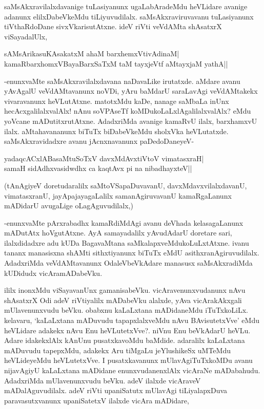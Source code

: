saMsAkxravilalxdavanige tuLasiyanunx ugaLabAradeMdu heVLidare avanige adanunx elilxDabeVkeMdu tiLiyuvudilalx. saMsAkxraviruvavanu tuLasiyanunx tiVthaRdoDane sivxVkarisutAtxne. ideV riVti veVdAMta shAsatxrX viSayadalUlx,

\begin{shloka}
sAMsArikasuKAsakatxM ahaM barxhemxVtivAdinaM|\\
kamaRbarxhomxVBayaBarxSaTxM taM tayxjeVtf aMtayxjaM yathA||
\end{shloka}

-enunxvaMte saMsAkxravilalxdavana naDavaLike irutatxde. aMdare avanu yAvAgalU veVdAMtavanunx noVDi, yAru baMdarU saraLavAgi veVdAMtakekx vivaravanunx heVLutAtxne. matotxMdu kaDe, nanage saMbaLa inUnx hecAcxgalilalxvalAlx! nAnu soVPAseTf koMDukoLaLxlAgalilalxvalAlx? eMdu yoVcane mADutitxrutAtxne. AdadxriMda avanige kamaRvU ilalx, barxhamxvU ilalx. aMtahavananunx biTuTx biDabeVkeMdu sholxVka heVLutatxde. saMsAkxravidadxre avanu jAcnxnavanunx paDedoDaneyeV-

\begin{shloka}
yadaqcACxlABasaMtuSoTxV davxMdAvxtiVtoV vimatasxraH|\\
samaH sidAdhxvasidwdhx ca kaqtAvx pi na nibadhayxteV||
\end{shloka}

(tAnAgiyeV doretudaralilx saMtoVSapaDuvavanU, davxMdavxvilalxdavanU, vimatasxranU, jayApajayagaLalilx samanAgiruvavanU kamaRgaLanunx mADidarU avugaLige oLagAguvudilalx,)

-enunxvaMte pArxrabadhx kamaRdiMdAgi avanu deVhada kelasagaLanunx mADutAtx hoVgutAtxne. AyA samayadalilx yAvudAdarU doretare sari, ilalxdidadxre adu kUDa BagavaMtana saMkalapxveMdukoLuLxtAtxne. ivanu tananx manasisxna shAMti sithxtiyanunx biTuTx eMdU asithxranAgiruvudilalx. AdadxriMda veVdAMtavanunx OdaleVbeVkAdare manasusx saMsAkxradiMda kUDidudx vicAramADabeVku.

ililx inonxMdu viSayavanUnx gamanisabeVku. vicAravenunxvudanunx nAvu shAsatxrX Odi adeV riVtiyalilx mADabeVku alalxde, yAva vicArakAkxgali mUlavenunxvudu beVku. obabxnu kaLaLxtana mADidaneMdu iTuTxkoLiLx. kelavaru, `kaLaLxtana mADuvudu tapapxlalxveMdu nAvu BAvisutetxVve' eMdu heVLidare adakekx nAvu Enu heVLutetxVve?. niVnu Enu beVkAdarU heVLu. Adare idakekxlAlx kAnUnu pusatxkavoMdu baMdide. adaralilx kaLaLxtana mADuvudu tapepxMdu, adakekx Aru tiMgaLu jeYlushikeSx uMTeMdu heVLideyeMdu heVLutetxVve. I pusatxkavanunx mUlavAgiTuTxkoMDu avanu nijavAgiyU kaLaLxtana mADidane enunxvudanenxlAlx vicAraNe mADabahudu. AdadxriMda mUlavenunxvudu beVku. adeV ilalxde vicAraveV mADalAguvudilalx. adeV riVti upaniSatutx mUlavAgi tiLiyalapxDuva paravasutxvanunx upaniSatetxV ilalxde vicAra mADidare,

